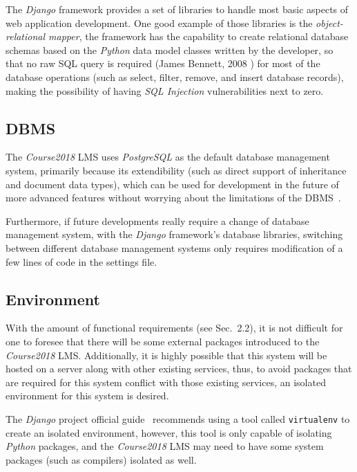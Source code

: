 The \emph{Django} framework provides a set of libraries to handle most basic
aspects of web application development. One good example of those libraries is
the \emph{object-relational mapper}, the framework has the capability to create
relational database schemas based on the \emph{Python} data model classes
written by the developer, so that no raw SQL query is required
(James Bennett, 2008 \cite{django}) for most of the
database operations (such as select, filter, remove, and insert database
records),
making the possibility of having \emph{SQL Injection} vulnerabilities next
to zero.

\subsection{DBMS}
The \emph{Course2018} LMS uses \emph{PostgreSQL} as the default database
management system, primarily because its extendibility (such as direct
support of inheritance and document data types), which can be used for
development in the future of more advanced features without worrying about the
limitations of the DBMS~\cite{postgres}.

\medskip

Furthermore, if future developments really require a change of database
management system,
with the \emph{Django} framework's database libraries,
switching between different database management systems only requires
modification of a few lines of code in the settings file.

\subsection{Environment}
With the amount of functional requirements (see Sec.~2.2), it is not difficult for
one to foresee that there will be some external packages introduced to the
\emph{Course2018} LMS.
Additionally, it is highly possible that this system will be hosted
on a server along with other existing services, thus, to avoid packages that
are required for this system conflict with those existing services, an
isolated environment for this system is desired.

\medskip
The \emph{Django} project official guide~\cite{djangoGuide} recommends using
a tool called \texttt{virtualenv} to create an isolated environment, however,
this tool is only capable of isolating \emph{Python} packages, and the
\emph{Course2018} LMS may need to have some system packages (such as
compilers) isolated as well.

\medskip

